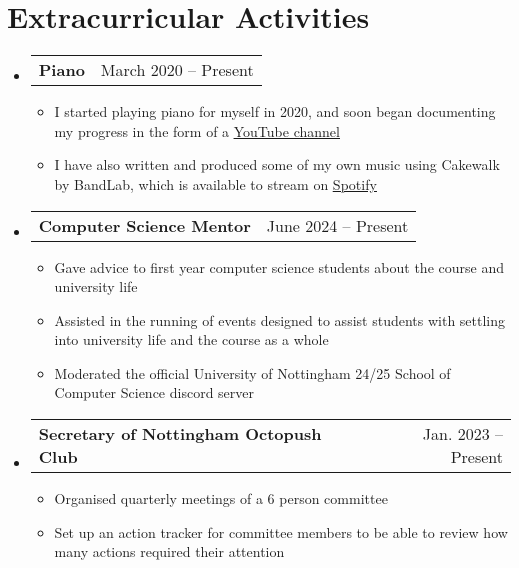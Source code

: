 \documentclass[letterpaper,11pt]{article}
\makeatletter
\newcommand{\resumeItem}[1]{
  \item\small{
    {#1 \vspace{-2pt}}
  }
}
\newcommand{\resumeProjectHeading}[2]{
    \item
    \begin{tabular*}{0.97\textwidth}{l@{\extracolsep{\fill}}r}
      \small#1 & #2 \\
    \end{tabular*}\vspace{-7pt}
}
\newcommand{\resumeSubHeadingListStart}{\begin{itemize}[leftmargin=0.15in, label={}]}
\newcommand{\resumeSubHeadingListEnd}{\end{itemize}}
\newcommand{\resumeItemListStart}{\begin{itemize}}
\newcommand{\resumeItemListEnd}{\end{itemize}\vspace{-5pt}}
\makeatother
\begin{document}


\section{Extracurricular Activities}
 \resumeSubHeadingListStart
 
  \resumeProjectHeading
   {\textbf{Piano} }{March 2020 -- Present}
  \resumeItemListStart
    \resumeItem{I started playing piano for myself in 2020, and soon began documenting my progress in the form of a \href{https://www.youtube.com/@olisharppiano}{\underline{YouTube channel}}}
    \resumeItem{I have also written and produced some of my own music using Cakewalk by BandLab, which is available to stream on \href{https://open.spotify.com/artist/6LruVw10BsMoQSLqjqANQI?si=QLf49HMaT3a0i50DmHI0gQ}{\underline{Spotify}}}
  \resumeItemListEnd
  
   \resumeProjectHeading
    {\textbf{Computer Science Mentor}}{June 2024 -- Present}
    \resumeItemListStart
        \resumeItem{Gave advice to first year computer science students about the course and university life}
        \resumeItem{Assisted in the running of events designed to assist students with settling into university life and the course as a whole}
        \resumeItem{Moderated the official University of Nottingham 24/25 School of Computer Science discord server}
    \resumeItemListEnd
    
  \resumeProjectHeading
    {\textbf{Secretary of Nottingham Octopush Club}}{Jan. 2023 -- Present}
    \resumeItemListStart
        \resumeItem{Organised quarterly meetings of a 6 person committee}
        \resumeItem{Set up an action tracker for committee members to be able to review how many actions required their attention}
    \resumeItemListEnd
 \resumeSubHeadingListEnd


\end{document}
